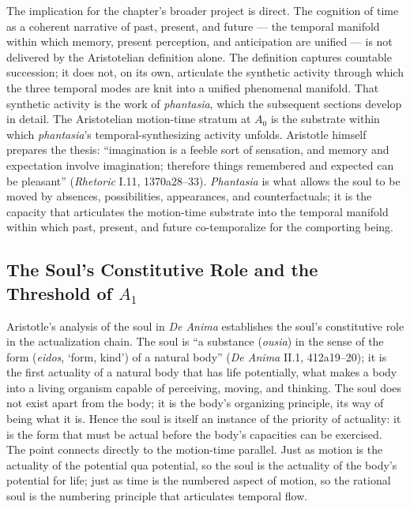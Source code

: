 The implication for the chapter's broader project is direct. The cognition of time as a coherent narrative of past, present, and future --- the temporal manifold within which memory, present perception, and anticipation are unified --- is not delivered by the Aristotelian definition alone. The definition captures countable succession; it does not, on its own, articulate the synthetic activity through which the three temporal modes are knit into a unified phenomenal manifold. That synthetic activity is the work of \textit{phantasia}, which the subsequent sections develop in detail. The Aristotelian motion-time stratum at $A_0$ is the substrate within which \textit{phantasia}'s temporal-synthesizing activity unfolds. Aristotle himself prepares the thesis: ``imagination is a feeble sort of sensation, and memory and expectation involve imagination; therefore things remembered and expected can be pleasant'' (\textit{Rhetoric} I.11, 1370a28--33). \textit{Phantasia} is what allows the soul to be moved by absences, possibilities, appearances, and counterfactuals; it is the capacity that articulates the motion-time substrate into the temporal manifold within which past, present, and future co-temporalize for the comporting being.

\subsection{The Soul's Constitutive Role and the Threshold of $A_1$}

Aristotle's analysis of the soul in \textit{De Anima} establishes the soul's constitutive role in the actualization chain. The soul is ``a substance (\textit{ousia}) in the sense of the form (\textit{eidos},  `form, kind') of a natural body'' (\textit{De Anima} II.1, 412a19--20); it is the first actuality of a natural body that has life potentially, what makes a body into a living organism capable of perceiving, moving, and thinking. The soul does not exist apart from the body; it is the body's organizing principle, its way of being what it is. Hence the soul is itself an instance of the priority of actuality: it is the form that must be actual before the body's capacities can be exercised. The point connects directly to the motion-time parallel. Just as motion is the actuality of the potential qua potential, so the soul is the actuality of the body's potential for life; just as time is the numbered aspect of motion, so the rational soul is the numbering principle that articulates temporal flow.


